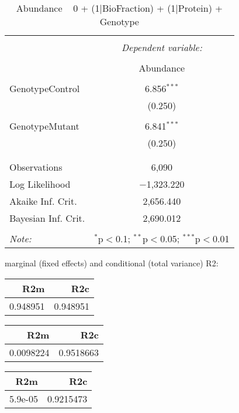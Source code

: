 \documentclass[11pt]{report}
\begin{document}
\begin{table}[!htbp] \centering 
  \caption{Abundance ~ 0 + (1|BioFraction) + (1|Protein) + Genotype} 
  \label{} 
\begin{tabular}{@{\extracolsep{5pt}}lc} 
\\[-1.8ex]\hline 
\hline \\[-1.8ex] 
 & \multicolumn{1}{c}{\textit{Dependent variable:}} \\ 
\cline{2-2} 
\\[-1.8ex] & Abundance \\ 
\hline \\[-1.8ex] 
 GenotypeControl & 6.856$^{***}$ \\ 
  & (0.250) \\ 
  & \\ 
 GenotypeMutant & 6.841$^{***}$ \\ 
  & (0.250) \\ 
  & \\ 
\hline \\[-1.8ex] 
Observations & 6,090 \\ 
Log Likelihood & $-$1,323.220 \\ 
Akaike Inf. Crit. & 2,656.440 \\ 
Bayesian Inf. Crit. & 2,690.012 \\ 
\hline 
\hline \\[-1.8ex] 
\textit{Note:}  & \multicolumn{1}{r}{$^{*}$p$<$0.1; $^{**}$p$<$0.05; $^{***}$p$<$0.01} \\ 
\end{tabular} 
\end{table} 
marginal (fixed effects) and conditional (total variance) R2:

\begin{tabular}{r|r}
\hline
R2m & R2c\\
\hline
0.948951 & 0.948951\\
\hline
\end{tabular}

\begin{tabular}{r|r}
\hline
R2m & R2c\\
\hline
0.0098224 & 0.9518663\\
\hline
\end{tabular}

\begin{tabular}{r|r}
\hline
R2m & R2c\\
\hline
5.9e-05 & 0.9215473\\
\hline
\end{tabular}
\end{document}
